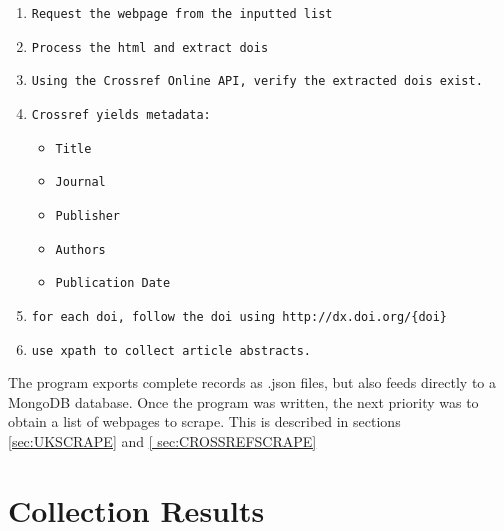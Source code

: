 \begin{sloppypar}
\begin{enumerate}
\item \texttt{Request the webpage from the inputted list}
\item \texttt{Process the html and extract dois}
\item \texttt{Using the Crossref Online API, verify the extracted dois exist.}
\item \texttt{Crossref yields metadata:}
\begin{itemize}
\item \texttt{Title}
\item \texttt{Journal}
\item \texttt{Publisher}
\item \texttt{Authors}
\item \texttt{Publication Date}
\end{itemize}
\item \texttt{for each doi, follow the doi using \texttt{http://dx.doi.org/\{doi\}}}
\item \texttt{use xpath to collect article abstracts.}
\end{enumerate}
\end{sloppypar}
The program exports complete records as .json files, but also feeds directly to a MongoDB database. Once the program was written, the next priority was to obtain a list of webpages to scrape. This is described in sections \ref{sec:UKSCRAPE} and \ref{ sec:CROSSREFSCRAPE} 
\section{Collection Results}
